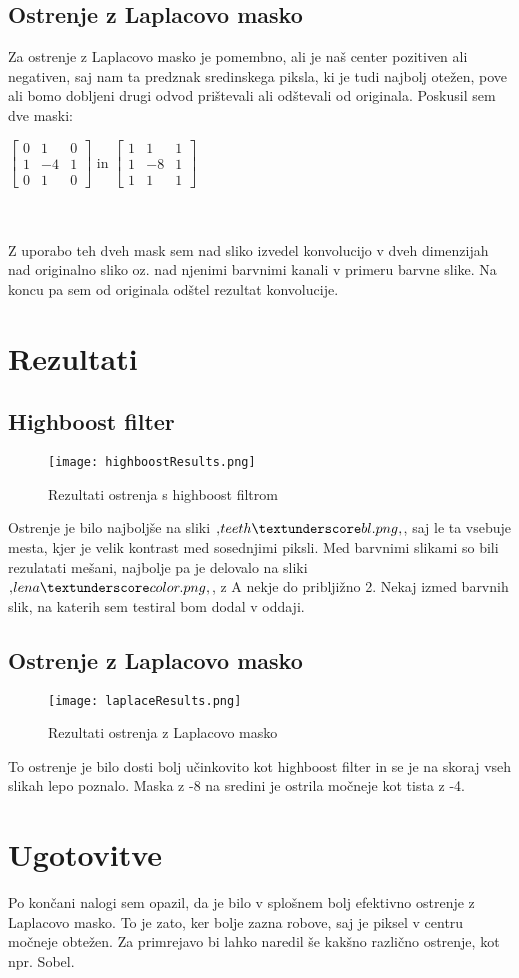 \documentclass{article}
\begin{document}
	\subsection{Ostrenje z Laplacovo masko}
	Za ostrenje z Laplacovo masko je pomembno, ali je naš center pozitiven ali negativen, saj nam ta predznak sredinskega piksla, ki je tudi najbolj otežen, pove ali bomo dobljeni drugi odvod prištevali ali odštevali od originala. Poskusil sem dve maski: \\
	\centerline{
	$\begin{bmatrix}
	0 & 1 & 0\\
	1 & -4 & 1\\
	0 & 1 & 0
	\end{bmatrix}$
	 in 
	$\begin{bmatrix}
	1 & 1 & 1\\
	1 & -8 & 1\\
	1 & 1 & 1
	\end{bmatrix}$}\\
	\\
	Z uporabo teh dveh mask sem nad sliko izvedel konvolucijo v dveh dimenzijah nad originalno sliko oz. nad njenimi barvnimi kanali v primeru barvne slike. Na koncu pa sem od originala odštel rezultat konvolucije.
	\section{Rezultati}
	\subsection{Highboost filter}
	\begin{figure}[h!]
		\texttt{[image: highboostResults.png]}
		\caption{Rezultati ostrenja s highboost filtrom}
		\label{fig:resultsHighboost}
	\end{figure}
	
	Ostrenje je bilo najboljše na sliki $\textsc{\char13}teeth \textunderscore bl.png\textsc{\char13}$, saj le ta vsebuje mesta, kjer je velik kontrast med sosednjimi piksli. Med barvnimi slikami so bili rezulatati mešani, najbolje pa je delovalo na sliki $\textsc{\char13}lena \textunderscore color.png\textsc{\char13}$, z A nekje do pribljižno 2. Nekaj izmed barvnih slik, na katerih sem testiral bom dodal v oddaji.
	
	\subsection{Ostrenje z Laplacovo masko}
	\begin{figure}[h!]
		\texttt{[image: laplaceResults.png]}
		\caption{Rezultati ostrenja z Laplacovo masko}
		\label{fig:resultsLaplace}
	\end{figure}
	To ostrenje je bilo dosti bolj učinkovito kot highboost filter in se je na skoraj vseh slikah lepo poznalo. Maska z -8 na sredini je ostrila močneje kot tista z -4.
	
	\section{Ugotovitve}
	Po končani nalogi sem opazil, da je bilo v splošnem bolj efektivno ostrenje z Laplacovo masko. 
	To je zato, ker bolje zazna robove, saj je piksel v centru močneje obtežen.
	Za primrejavo bi lahko naredil še kakšno različno ostrenje, kot npr. Sobel. 
	
\end{document}
